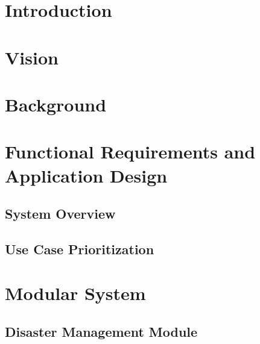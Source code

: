 \documentclass[a4paper,12pt]{article}
\begin{document}
	\newpage
	
	\section{Introduction}	
	
	
	\section{Vision}
		
	
	
	\section{Background}	
	
	
	
	\section{Functional Requirements and Application Design}
	
		\subsection{System Overview}
		
		
		\subsection{Use Case Prioritization}
		
		
	\section{Modular System}	
		\subsection{Disaster Management Module}
			
\end{document}
